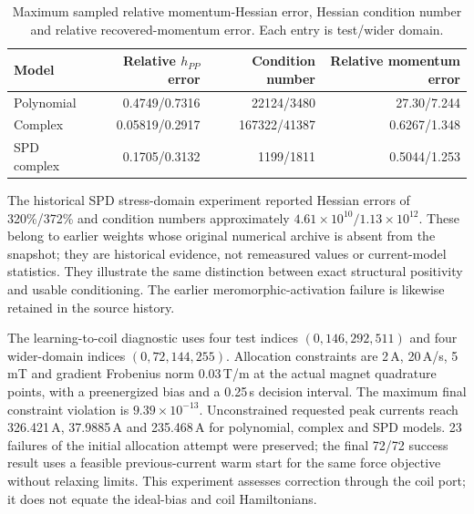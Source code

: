 \begin{table}[H]
\centering
\caption{Maximum sampled relative momentum-Hessian error, Hessian condition number and relative recovered-momentum error. Each entry is test/wider domain.}
\label{tab:supp-learning-inverse}
\begin{tabular}{lrrr}
\toprule
Model & Relative $h_{PP}$ error & Condition number & Relative momentum error\\
\midrule
Polynomial & 0.4749/0.7316 & 22124/3480 & 27.30/7.244\\
Complex & 0.05819/0.2917 & 167322/41387 & 0.6267/1.348\\
SPD complex & 0.1705/0.3132 & 1199/1811 & 0.5044/1.253\\
\bottomrule
\end{tabular}
\end{table}

The historical SPD stress-domain experiment reported Hessian errors of 320\%/372\% and condition numbers approximately $4.61\times10^{10}/1.13\times10^{12}$. These belong to earlier weights whose original numerical archive is absent from the snapshot; they are historical evidence, not remeasured values or current-model statistics. They illustrate the same distinction between exact structural positivity and usable conditioning. The earlier meromorphic-activation failure is likewise retained in the source history.

The learning-to-coil diagnostic uses four test indices $(0,146,292,511)$ and four wider-domain indices $(0,72,144,255)$. Allocation constraints are 2\,A, 20\,A/s, 5\,mT and gradient Frobenius norm 0.03\,T/m at the actual magnet quadrature points, with a preenergized bias and a 0.25\,s decision interval. The maximum final constraint violation is $9.39\times10^{-13}$. Unconstrained requested peak currents reach 326.421\,A, 37.9885\,A and 235.468\,A for polynomial, complex and SPD models. 23 failures of the initial allocation attempt were preserved; the final 72/72 success result uses a feasible previous-current warm start for the same force objective without relaxing limits. This experiment assesses correction through the coil port; it does not equate the ideal-bias and coil Hamiltonians.

